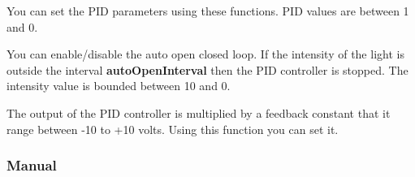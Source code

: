 You can set the PID parameters using these functions. PID values are
between 1 and 0.

\begin{Shaded}
\begin{Highlighting}[]
\NormalTok{;}
\NormalTok{;}
\NormalTok{;}
\end{Highlighting}
\end{Shaded}

You can enable/disable the auto open closed loop. If the intensity of
the light is outside the interval \textbf{autoOpenInterval} then the PID
controller is stopped. The intensity value is bounded between 10 and 0.

\begin{Shaded}
\begin{Highlighting}[]
\NormalTok{;}
\NormalTok{;}
\NormalTok{);}
\end{Highlighting}
\end{Shaded}

The output of the PID controller is multiplied by a feedback constant
that it range between -10 to +10 volts. Using this function you can set
it.

\begin{Shaded}
\begin{Highlighting}[]
\NormalTok{;}
\NormalTok{;}
\end{Highlighting}
\end{Shaded}

\hypertarget{manual}{%
\subsubsection{Manual}\label{manual}}

